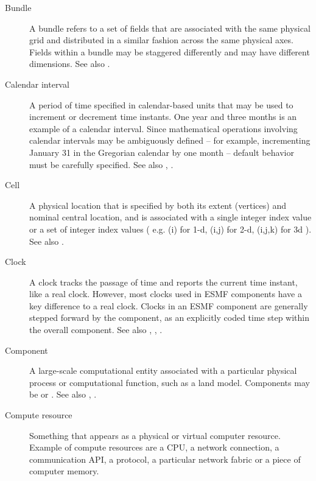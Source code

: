 \begin{description}
\item[Bundle] \label{glos:Bundle} A bundle refers to a set of fields that 
  are associated with the same physical grid and distributed in a similar 
  fashion across the same physical axes.  Fields within a bundle may be
  staggered differently and may have different dimensions. 
  See also . 

\item[Calendar interval] \label{glos:CalInt} A period of time specified
  in calendar-based units that may be used to increment or decrement time instants.  
  One year and three months is an example of a calendar interval.  Since 
  mathematical operations involving calendar intervals may be ambiguously 
  defined -- for example, incrementing January 31 in the Gregorian calendar by 
  one month -- default behavior must be carefully specified.  
  See also , .

\item[Cell] \label{glos:Cell} A physical location that is specified by both 
  its extent (vertices) and nominal central location, and is associated with 
  a single integer index value or a set of integer index values ( e.g.
  (i) for 1-d, (i,j) for 2-d, (i,j,k) for 3d ). 
  See also .

\item[Clock] \label{glos:Clock} A clock tracks the passage of time and 
  reports the current time instant, like a real clock.  However, most clocks 
  used in ESMF components have a key difference to a real clock. Clocks 
  in an ESMF component are generally stepped forward by the component, as an 
  explicitly coded time step within the overall component.
  See also , 
  , .

\item[Component] \label{glos:Component} A large-scale computational entity 
  associated with a particular physical process or computational function, 
  such as a land model.  Components may be  
  or .  
  See also , 
  .

\item[Compute resource] \label{glos:CompResource} Something that appears as a
  physical or virtual computer resource. Example of compute resources
  are a CPU, a network connection, a communication API, a protocol, a 
  particular network fabric or a piece of computer memory. 


\end{description}
